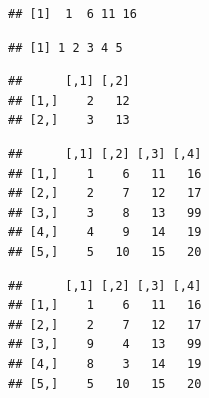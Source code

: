 \documentclass[krantz2]{krantz}\usepackage{knitr}
\begin{document}
\begin{knitrout}\footnotesize
{}\color{fgcolor}\begin{kframe}
\begin{alltt}
\hlstd{A[}\hlstd{, ]}
\end{alltt}
\begin{verbatim}
## [1]  1  6 11 16
\end{verbatim}
\begin{alltt}
\hlstd{A[ ,} \hlstd{]}
\end{alltt}
\begin{verbatim}
## [1] 1 2 3 4 5
\end{verbatim}
\begin{alltt}
\hlstd{A[}\hlopt{:}\hlstd{,} \hlstd{(}\hlstd{,}\hlstd{)]}
\end{alltt}
\begin{verbatim}
##      [,1] [,2]
## [1,]    2   12
## [2,]    3   13
\end{verbatim}
\begin{alltt}
\hlstd{A[}\hlstd{,} \hlstd{]} \hlkwb{<-} 
\end{alltt}
\begin{verbatim}
##      [,1] [,2] [,3] [,4]
## [1,]    1    6   11   16
## [2,]    2    7   12   17
## [3,]    3    8   13   99
## [4,]    4    9   14   19
## [5,]    5   10   15   20
\end{verbatim}
\begin{alltt}
\hlstd{A[}\hlopt{:}\hlstd{,} \hlopt{:}\hlstd{]} \hlkwb{<-} \hlstd{A[}\hlopt{:}\hlstd{,} \hlopt{:}\hlstd{]}
\end{alltt}
\begin{verbatim}
##      [,1] [,2] [,3] [,4]
## [1,]    1    6   11   16
## [2,]    2    7   12   17
## [3,]    9    4   13   99
## [4,]    8    3   14   19
## [5,]    5   10   15   20
\end{verbatim}
\end{kframe}
\end{knitrout}
\end{document}
